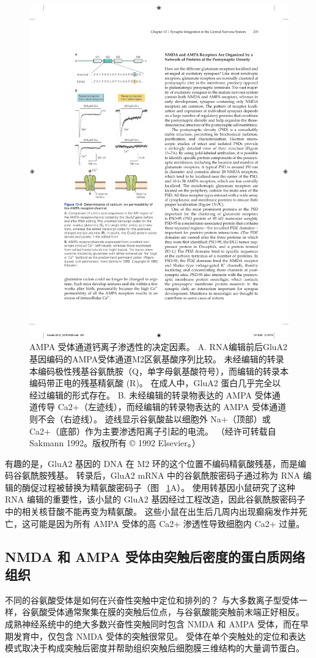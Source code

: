 \begin{figure}[htbp]
	\centering
	\includegraphics[width=0.45\linewidth]{chap13/fig_13_6}
	\caption{AMPA 受体通道钙离子渗透性的决定因素。 A. RNA编辑前后GluA2基因编码的AMPA受体通道M2区氨基酸序列比较。 未经编辑的转录本编码极性残基谷氨酰胺（Q，单字母氨基酸符号），而编辑的转录本编码带正电的残基精氨酸 (R)。 在成人中，GluA2 蛋白几乎完全以经过编辑的形式存在。 B. 未经编辑的转录物表达的 AMPA 受体通道传导 Ca2+（左迹线），而经编辑的转录物表达的 AMPA 受体通道则不会（右迹线）。 迹线显示谷氨酸盐以细胞外 Na+（顶部）或 Ca2+（底部）作为主要渗透阳离子引起的电流。 （经许可转载自 Sakmann 1992。版权所有 © 1992 Elsevier。）}
	\label{fig:13_6}
\end{figure}


有趣的是，GluA2 基因的 DNA 在 M2 环的这个位置不编码精氨酸残基，而是编码谷氨酰胺残基。
转录后，GluA2 mRNA 中的谷氨酰胺密码子通过称为 RNA 编辑的酶促过程被替换为精氨酸密码子（图 ~\ref{fig:13_6}A）。
使用转基因小鼠研究了这种 RNA 编辑的重要性，该小鼠的 GluA2 基因经过工程改造，因此谷氨酰胺密码子中的相关核苷酸不能再变为精氨酸。
这些小鼠在出生后几周内出现癫痫发作并死亡，这可能是因为所有 AMPA 受体的高 Ca2+ 渗透性导致细胞内 Ca2+ 过量。



\subsection{NMDA 和 AMPA 受体由突触后密度的蛋白质网络组织}

不同的谷氨酸受体是如何在兴奋性突触中定位和排列的？ 
与大多数离子型受体一样，谷氨酸受体通常聚集在膜的突触后位点，与谷氨酸能突触前末端正好相反。
成熟神经系统中的绝大多数兴奋性突触同时包含 NMDA 和 AMPA 受体，而在早期发育中，仅包含 NMDA 受体的突触很常见。
受体在单个突触处的定位和表达模式取决于构成突触后密度并帮助组织突触后细胞膜三维结构的大量调节蛋白。



